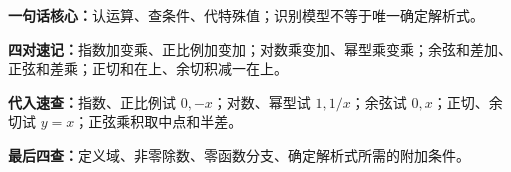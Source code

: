 \FReserve{5cm}
\begin{summarybox}
\textbf{一句话核心：}认运算、查条件、代特殊值；识别模型不等于唯一确定解析式。

\textbf{四对速记：}指数加变乘、正比例加变加；对数乘变加、幂型乘变乘；余弦和差加、正弦和差乘；正切和在上、余切积减一在上。

\textbf{代入速查：}指数、正比例试 $0,-x$；对数、幂型试 $1,1/x$；余弦试 $0,x$；正切、余切试 $y=x$；正弦乘积取中点和半差。

\textbf{最后四查：}定义域、非零除数、零函数分支、确定解析式所需的附加条件。
\end{summarybox}

